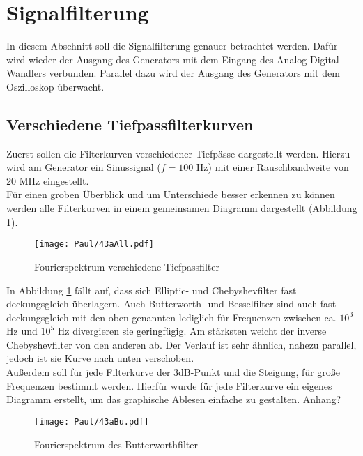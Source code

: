 \section{Signalfilterung}
In diesem Abschnitt soll die Signalfilterung genauer betrachtet werden. Dafür wird wieder der Ausgang des Generators mit dem Eingang des Analog-Digital-Wandlers verbunden. Parallel dazu wird der Ausgang des Generators mit dem Oszilloskop überwacht.

\subsection{Verschiedene Tiefpassfilterkurven}
\label{sec:VerTi}
Zuerst sollen die Filterkurven verschiedener Tiefpässe dargestellt werden. Hierzu wird am Generator ein Sinussignal ($f=100$ Hz) mit einer Rauschbandweite von 20 MHz eingestellt.\\

Für einen groben Überblick und um Unterschiede besser erkennen zu können werden alle Filterkurven in einem gemeinsamen Diagramm dargestellt (Abbildung \ref{fig:43aAll}). \\

\begin{figure}[h]
    \centering
    \texttt{[image: Paul/43aAll.pdf]}
    \caption{Fourierspektrum verschiedene Tiefpassfilter}
    \label{fig:43aAll}
\end{figure}

In Abbildung \ref{fig:43aAll} fällt auf, dass sich Elliptic- und Chebyshevfilter fast deckungsgleich überlagern. Auch Butterworth- und Besselfilter sind auch fast deckungsgleich mit den oben genannten lediglich für Frequenzen zwischen ca. $10^3$ Hz und $10^5$ Hz divergieren sie geringfügig. Am stärksten weicht der inverse Chebyshevfilter von den anderen ab. Der Verlauf ist sehr ähnlich, nahezu parallel, jedoch ist sie Kurve nach unten verschoben. \\

\newpage
Außerdem soll  für jede Filterkurve der 3dB-Punkt und die Steigung, für große Frequenzen bestimmt werden.
Hierfür wurde für jede Filterkurve ein eigenes Diagramm erstellt, um das graphische Ablesen einfache zu gestalten.
Anhang?


\begin{figure}[h]
    \centering
    \texttt{[image: Paul/43aBu.pdf]}
    \caption{Fourierspektrum des Butterworthfilter}
\end{figure}



